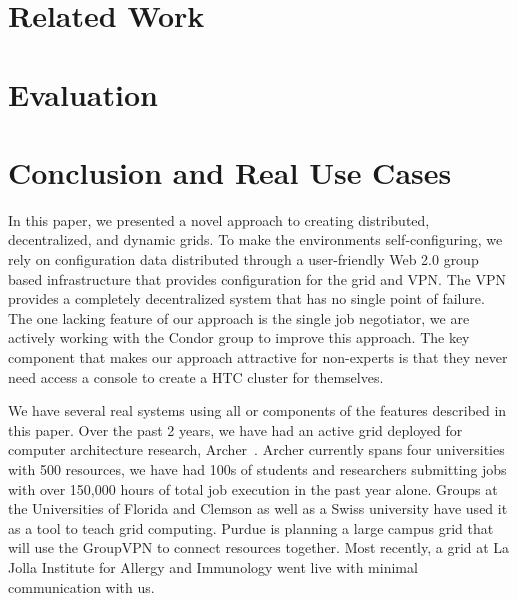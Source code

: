\documentclass{sig-alternate}
\begin{document}
\section{Related Work}
\label{related_work}
\section{Evaluation}
\label{evaluation}
\section{Conclusion and Real Use Cases}
\label{conclusion}
In this paper, we presented a novel approach to creating distributed,
decentralized, and dynamic grids.  To make the environments self-configuring,
we rely on configuration data distributed through a user-friendly Web 2.0 group
based infrastructure that provides configuration for the grid and VPN.  The VPN
provides a completely decentralized system that has no single point of failure.
The one lacking feature of our approach is the single job negotiator, we are
actively working with the Condor group to improve this approach.  The key
component that makes our approach attractive for non-experts is that they never
need access a console to create a HTC cluster for themselves.

We have several real systems using all or components of the features described
in this paper.  Over the past 2 years, we have had an active grid deployed for
computer architecture research, Archer~\cite{archer}.  Archer currently spans
four universities with 500 resources, we have had 100s of students and
researchers submitting jobs with over 150,000 hours of total job execution in
the past year alone.  Groups at the Universities of Florida and Clemson as well
as a Swiss university have used it as a tool to teach grid computing.  Purdue
is planning a large campus grid that will use the GroupVPN to connect resources
together.  Most recently, a grid at La Jolla Institute for Allergy and
Immunology went live with minimal communication with us.


\small{

\suppressfloats
}
\end{document}
